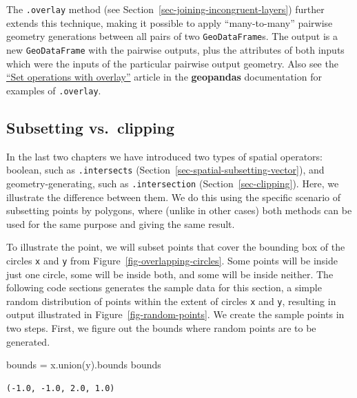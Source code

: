 \documentclass[
  letterpaper,
]{krantz}
\newenvironment{Shaded}{\begin{snugshade}}{\end{snugshade}}
\newcommand{\NormalTok}[1]{\textcolor[rgb]{0.00,0.23,0.31}{#1}}
\newcommand{\OperatorTok}[1]{\textcolor[rgb]{0.37,0.37,0.37}{#1}}
\begin{document}
The \texttt{.overlay} method (see
Section~\ref{sec-joining-incongruent-layers}) further extends this
technique, making it possible to apply ``many-to-many'' pairwise
geometry generations between all pairs of two \texttt{GeoDataFrame}s.
The output is a new \texttt{GeoDataFrame} with the pairwise outputs,
plus the attributes of both inputs which were the inputs of the
particular pairwise output geometry. Also see the
\href{https://geopandas.org/en/stable/docs/user_guide/set_operations.html}{``Set
operations with overlay''} article in the \textbf{geopandas}
documentation for examples of \texttt{.overlay}.

\subsection{Subsetting vs.~clipping}\label{sec-subsetting-vs-clipping}

In the last two chapters we have introduced two types of spatial
operators: boolean, such as \texttt{.intersects}
(Section~\ref{sec-spatial-subsetting-vector}), and geometry-generating,
such as \texttt{.intersection} (Section~\ref{sec-clipping}). Here, we
illustrate the difference between them. We do this using the specific
scenario of subsetting points by polygons, where (unlike in other cases)
both methods can be used for the same purpose and giving the same
result.

To illustrate the point, we will subset points that cover the bounding
box of the circles \texttt{x} and \texttt{y} from
Figure~\ref{fig-overlapping-circles}. Some points will be inside just
one circle, some will be inside both, and some will be inside neither.
The following code sections generates the sample data for this section,
a simple random distribution of points within the extent of circles
\texttt{x} and \texttt{y}, resulting in output illustrated in
Figure~\ref{fig-random-points}. We create the sample points in two
steps. First, we figure out the bounds where random points are to be
generated.

\begin{Shaded}
\begin{Highlighting}[]
\NormalTok{bounds }\OperatorTok{=}\NormalTok{ x.union(y).bounds}
\NormalTok{bounds}
\end{Highlighting}
\end{Shaded}

\begin{verbatim}
(-1.0, -1.0, 2.0, 1.0)
\end{verbatim}
\end{document}
